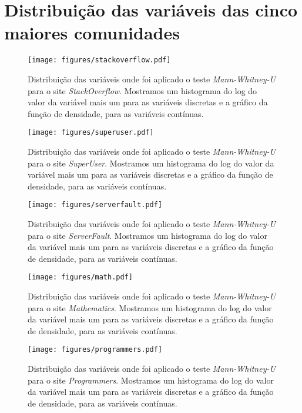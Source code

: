 \chapter{Distribuição das variáveis das cinco maiores comunidades}
\label{app:distrib}

\begin{figure}
  \centering
  \texttt{[image: figures/stackoverflow.pdf]}
  \caption[Distribuição das variáveis para o site \emph{StackOverflow}]{Distribuição das variáveis onde foi aplicado o teste \emph{Mann-Whitney-U} para o site \emph{StackOverflow}. Mostramos um histograma do log do valor da variável mais um para as variáveis discretas e a gráfico da função de densidade, para as variáveis contínuas. }
\end{figure}

\begin{figure}
	\centering
  \texttt{[image: figures/superuser.pdf]}
 \caption[Distribuição das variáveis para o site \emph{SuperUser}]{Distribuição das variáveis onde foi aplicado o teste \emph{Mann-Whitney-U} para o site \emph{SuperUser}. Mostramos um histograma do log do valor da variável mais um para as variáveis discretas e a gráfico da função de densidade, para as variáveis contínuas. }
\end{figure}

\begin{figure}
	\centering
  \texttt{[image: figures/serverfault.pdf]}
  \caption[Distribuição das variáveis para o site \emph{ServerFault}]{Distribuição das variáveis onde foi aplicado o teste \emph{Mann-Whitney-U} para o site \emph{ServerFault}. Mostramos um histograma do log do valor da variável mais um para as variáveis discretas e a gráfico da função de densidade, para as variáveis contínuas. }
\end{figure}

\begin{figure}
	\centering
  \texttt{[image: figures/math.pdf]}
  \caption[Distribuição das variáveis para o site \emph{Mathematics}]{Distribuição das variáveis onde foi aplicado o teste \emph{Mann-Whitney-U} para o site \emph{Mathematics}. Mostramos um histograma do log do valor da variável mais um para as variáveis discretas e a gráfico da função de densidade, para as variáveis contínuas. }
\end{figure}

\begin{figure}
  \centering
  \texttt{[image: figures/programmers.pdf]}
  \caption[Distribuição das variáveis para o site \emph{Programmers}]{Distribuição das variáveis onde foi aplicado o teste \emph{Mann-Whitney-U} para o site \emph{Programmers}. Mostramos um histograma do log do valor da variável mais um para as variáveis discretas e a gráfico da função de densidade, para as variáveis contínuas. }
\end{figure}
